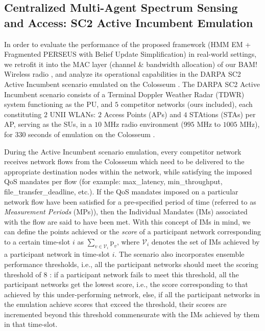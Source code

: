 \documentclass[12pt, draftcls, onecolumn]{IEEEtran}
\begin{document}
\subsection{Centralized Multi-Agent Spectrum Sensing and Access: SC2 Active Incumbent Emulation}\label{Y}
In order to evaluate the performance of the proposed framework (HMM EM + Fragmented PERSEUS with Belief Update Simplification) in real-world settings, we retrofit it into the MAC layer (channel \& bandwidth allocation) of our BAM! Wireless radio \cite{BAM}, and analyze its operational capabilities in the DARPA SC2 Active Incumbent scenario \cite{DARPA:ActiveIncumbent} emulated on the Colosseum \cite{DARPA:SC2c2api, DARPA:SC2scenarios}. The DARPA SC2 Active Incumbent scenario consists of a Terminal Doppler Weather Radar (TDWR) system functioning as the PU, and $5$ competitor networks (ours included), each constituting $2$ UNII WLANs: $2$ Access Points (APs) and $4$ STAtions (STAs) per AP, serving as the SUs, in a $10$ MHz radio environment ($995$ MHz to $1005$ MHz), for $330$ seconds of emulation on the Colosseum \cite{DARPA:ActiveIncumbent}.

During the Active Incumbent scenario emulation, every competitor network receives network flows from the Colosseum which need to be delivered to the appropriate destination nodes within the network, while satisfying the imposed QoS mandates per flow (for example: max\_latency, min\_throughput, file\_transfer\_deadline, etc.). If the QoS mandates imposed on a particular network flow have been satisfied for a pre-specified period of time (referred to as \emph{Measurement Periods} (MPs)), then the Individual Mandates (IMs) associated with the flow are said to have been met. With this concept of IMs in mind, we can define the points achieved or the \emph{score} of a participant network corresponding to a certain time-slot $i$ as $\sum_{v{\in}\mathcal{V}_{i}} \text{p}_{v}$, where $\mathcal{V}_{i}$ denotes the set of IMs achieved by a participant network in time-slot $i$. The scenario also incorporates ensemble performance thresholds, i.e., all the participant networks should meet the scoring threshold of $8$ \cite{DARPA:ActiveIncumbent}: if a participant network fails to meet this threshold, all the participant networks get the lowest score, i.e., the score corresponding to that achieved by this under-performing network, else, if all the participant networks in the emulation achieve scores that exceed the threshold, their scores are incremented beyond this threshold commensurate with the IMs achieved by them in that time-slot.
\end{document}
